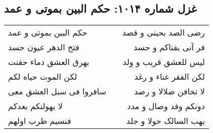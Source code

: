 \begin{center}
\section*{غزل شماره ۱۰۱۴: حکم البین بموتی و عمد}
\label{sec:1014}
\begin{longtable}{l p{0.5cm} r}
حکم البین بموتی و عمد
&&
رضی الصد بحینی و قصد
\\
فتح الدهر عیون حسد
&&
فر آنی بفناکم و حسد
\\
یهرق العشق دماء حقنت
&&
لیس للعشق قریب و ولد
\\
لکن الموت حیاه لکم
&&
لکن الفقر غناء و رغد
\\
سافروا فی سبل العشق معی
&&
لا تخافن ضلالا و رصد
\\
لا یهولنکم بعدکم
&&
دونکم وفد وصال و مدد
\\
فنسیم طرب اولهم
&&
یهب السالک حولا و جلد
\\
\end{longtable}
\end{center}
